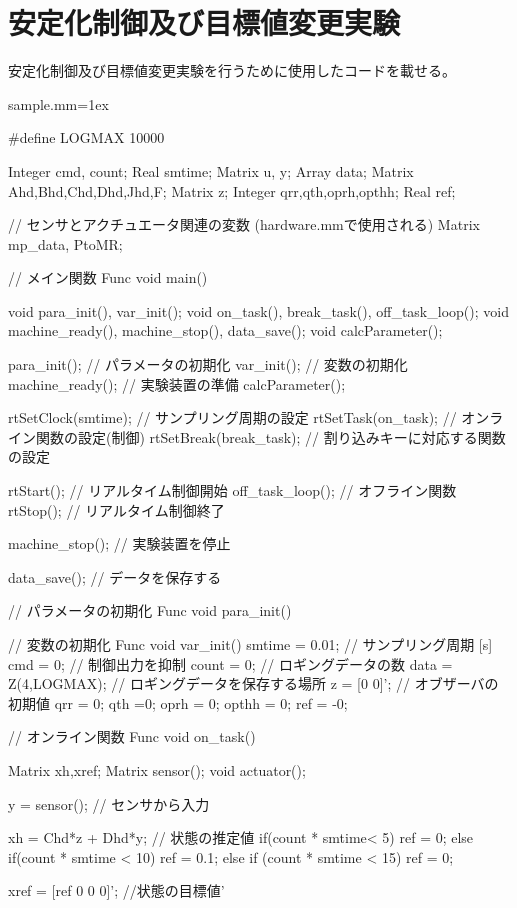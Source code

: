 \section{安定化制御及び目標値変更実験}
	安定化制御及び目標値変更実験を行うために使用したコードを載せる。
	\begin{itembox}[l]{sample.mm}\baselineskip=1ex
		\begin{verbatimtab}[4]
#define LOGMAX 10000

Integer cmd, count;
Real smtime;
Matrix u, y;
Array data;
Matrix Ahd,Bhd,Chd,Dhd,Jhd,F;
Matrix z;
Integer qrr,qth,oprh,opthh;
Real ref;

// センサとアクチュエータ関連の変数 (hardware.mmで使用される)
Matrix mp_data, PtoMR;

// メイン関数
Func void main()
{
	void para_init(), var_init();
	void on_task(), break_task(), off_task_loop();
	void machine_ready(), machine_stop(), data_save();
	void calcParameter();

	para_init();			// パラメータの初期化
	var_init();             // 変数の初期化
	machine_ready();        // 実験装置の準備
	calcParameter();

	rtSetClock(smtime);     // サンプリング周期の設定
	rtSetTask(on_task);		// オンライン関数の設定(制御)
	rtSetBreak(break_task); // 割り込みキーに対応する関数の設定

	rtStart();              // リアルタイム制御開始
	off_task_loop();        // オフライン関数
	rtStop();               // リアルタイム制御終了

	machine_stop();         // 実験装置を停止

	data_save();			// データを保存する
}

// パラメータの初期化
Func void para_init()
{
}

// 変数の初期化
Func void var_init()
{
	smtime = 0.01;		// サンプリング周期 [s]
	cmd = 0;			// 制御出力を抑制
	count = 0;			// ロギングデータの数
	data = Z(4,LOGMAX); // ロギングデータを保存する場所
	z = [0 0]';            // オブザーバの初期値
	qrr = 0;
	qth =0;
	oprh = 0;
	opthh = 0;
ref = -0;
}

// オンライン関数
Func void on_task()
{
	Matrix xh,xref;
	Matrix sensor();
	void actuator();

	y = sensor();				// センサから入力

	xh = Chd*z + Dhd*y; // 状態の推定値
	if(count * smtime< 5){
		ref = 0;
	} else if(count * smtime < 10){
		ref = 0.1;
	} else if (count * smtime < 15){
		ref = 0;
	}

	xref = [ref 0 0 0]'; //状態の目標値'
		
}
\end{verbatimtab}
\end{itembox}
